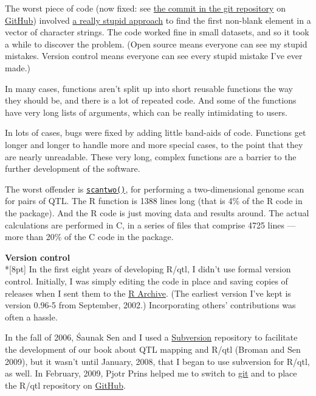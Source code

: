 \documentclass[letterpaper]{article}
\begin{document}
\begin{multicols}{2}
The worst piece of code (now fixed: see
\href{https://github.com/kbroman/qtl/commit/4cd486}{the commit in the
git repository} on \href{http://github.com}{GitHub})
involved
\href{http://kbroman.wordpress.com/2011/08/17/the-stupidest-r-code-ever/}{a
really stupid approach} to find the first non-blank element in a
vector of character strings. The code worked fine in small datasets,
and so it took a while to discover the problem. (Open source means
everyone can see my stupid mistakes. Version control means everyone
can see every stupid mistake I've ever made.)

In many cases, functions aren't split up into short reusable functions
the way they should be, and there is a lot of repeated code.  And some
of the functions have very long lists of arguments, which can be
really intimidating to users.

In lots of cases, bugs were fixed by adding little band-aids of code.
Functions get longer and longer to handle more and more special cases,
to the point that they are nearly unreadable.  These very long,
complex functions are a barrier to the further development of the
software.

The worst offender is
\href{https://github.com/kbroman/qtl/blob/master/R/scantwo.R}{\tt scantwo()},
for performing a two-dimensional genome scan for pairs of QTL.  The R
function is 1388 lines long (that is 4\% of the R code in the
package). And the R code is just moving data and results around.  The
actual calculations are performed in C, in a series of files that
comprise 4725 lines --- more than 20\% of the C code in the package.



\bigskip
{}
\noindent \textbf{\sffamily Version control}\\*[8pt]
In the first eight years of developing R/qtl, I didn't use formal
version control.  Initially, I was simply editing the code in place
and saving copies of releases when I sent them to the
\href{http://cran.r-project.org}{R Archive}.  (The earliest version
I've kept is version 0.96-5 from September, 2002.) Incorporating
others' contributions was often a hassle.

In the fall of 2006, \'Saunak Sen and I used a
\href{http://subversion.apache.org/}{Subversion} repository to
facilitate the development of our book about QTL mapping and R/qtl
(Broman and Sen 2009), but it wasn't until January, 2008, that I began
to use subversion for R/qtl, as well. In February, 2009, Pjotr Prins
helped me to switch to \href{http://git-scm.com}{git} and to place the
R/qtl repository on \href{http://github.com}{GitHub}.


\end{multicols}
\end{document}
